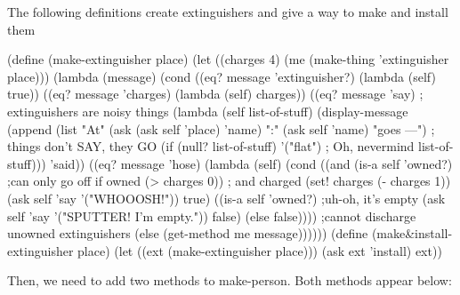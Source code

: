 The following definitions create extinguishers and give a way to make
and install them

\beginlisp
(define (make-extinguisher place)
  (let ((charges 4)
        (me (make-thing 'extinguisher place)))
    (lambda (message)
      (cond ((eq? message 'extinguisher?) (lambda (self) true))
            ((eq? message 'charges)       (lambda (self) charges))
            ((eq? message 'say)                      ; extinguishers are noisy things
             (lambda (self list-of-stuff)
               (display-message
                 (append (list "At" (ask (ask self 'place) 'name)
                               ":"  (ask self 'name)
                               "goes ---")           ; things don't SAY, they GO
                         (if (null? list-of-stuff)
                             '("flat")               ; Oh, nevermind
                             list-of-stuff)))
               'said))
            ((eq? message 'hose)
             (lambda (self)
               (cond ((and (is-a self 'owned?)   ;can only go off if owned
                           (> charges 0))        ; and charged
                      (set! charges (- charges 1))
                      (ask self 'say '("WHOOOSH!"))
                      true)
                     ((is-a self 'owned?)        ;uh-oh, it's empty
                      (ask self 'say '("SPUTTER! I'm empty."))
                      false)
                     (else false))))  ;cannot discharge unowned extinguishers
            (else (get-method me message))))))
\null
\endlisp
\beginlisp
(define (make\&install-extinguisher place)
  (let ((ext (make-extinguisher place)))
    (ask ext 'install)
    ext))
\endlisp

Then, we need to add two methods to {\cf make-person}.  Both methods
appear below:

